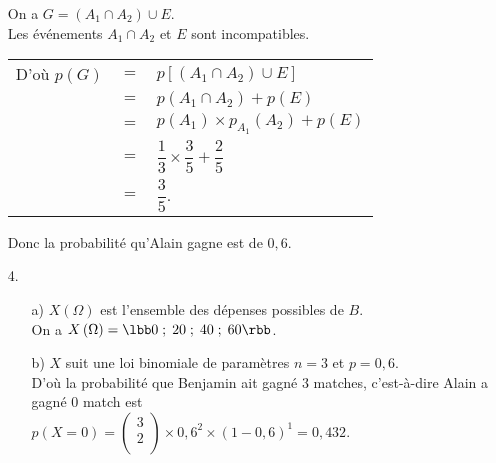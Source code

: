 \begin{itemize}
On a $G = \left(A_1 \cap A_2\right) \cup E$. \\

Les événements $A_1 \cap A_2$ et $E$ sont incompatibles. 

\vspace*{-5cm}

\newpage

\vspace*{-.5cm}

\begin{tabular}{lll}
\hspace*{-.3cm} D'où $p\left(G\right)$ & $=$ & $p\left[\left(A_1 \cap A_2\right) \cup E\right]$ \\
& $=$ & $p\left(A_1 \cap A_2\right) + p\left(E\right)$ \\
& $=$ & $p\left(A_1\right) \times p_{A_1}\left(A_2\right) + p\left(E\right)$ \vspace*{.3cm} \\
& $=$ & $\dfrac{1}{3} \times \dfrac{3}{5} + \dfrac{2}{5}$ \vspace*{.3cm} \\
& $=$ & $\dfrac{3}{5}$. \\
\end{tabular}

\vspace*{.3cm}

Donc la probabilité qu'Alain gagne est de $0,6$. \\

\item[4.]
\begin{itemize}
\item[a)] $X\left(\Omega\right)$ est l'ensemble des dépenses possibles de $B$. \\

On a $X\left(\Omega\right) = \lbb 0 \; ; \; 20 \; ; \; 40 \; ; \; 60 \rbb $. \\

\item[b)] $X$ suit une loi binomiale de paramètres $n = 3$ et $p = 0,6$. \\

D'où la probabilité que Benjamin ait gagné $3$ matches, c'est-à-dire Alain a gagné $0$ match est \\ $p\left(X = 0\right) = \begin{pmatrix}
3 \\
2 \\
\end{pmatrix} \times 0,6^2 \times \left(1 - 0,6\right)^1 = 0,432$. \\


\end{itemize}
\end{itemize}
